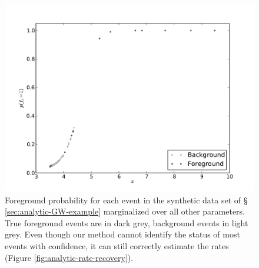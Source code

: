 \documentclass[aps,prd,reprint,nofootinbib]{revtex4-1}
\begin{document}
\begin{figure}
  \includegraphics[width=\columnwidth]{pfore}
  \caption{\label{fig:analytic-rate-foreground-probs} Foreground
    probability for each event in the synthetic data set of \S
    \ref{sec:analytic-GW-example} marginalized over all other
    parameters.  True foreground events are in dark grey, background
    events in light grey.  Even though our method cannot identify the
    status of most events with confidence, it can still correctly
    estimate the rates (Figure \ref{fig:analytic-rate-recovery}).}
\end{figure}
\end{document}
